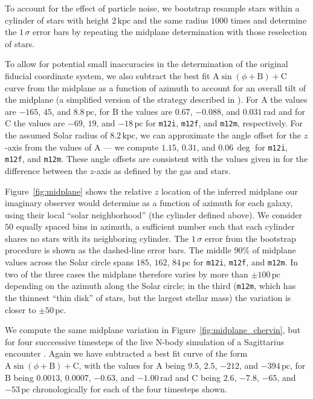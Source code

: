 \documentclass[twocolumn]{aastex62}
\newcommand{\pc}{\text{pc}}
\newcommand{\kpc}{\text{kpc}}
\newcommand{\mi}{\texttt{m12i}}
\newcommand{\mf}{\texttt{m12f}}
\newcommand{\mm}{\texttt{m12m}}
\begin{document}
To account for the effect of particle noise, we bootstrap resample stars
within a cylinder of stars with height $2\,\kpc$ and the same radius $1000$
times and determine the $1\,\sigma$ error bars by repeating the midplane
determination with those reselection of stars.

To allow for potential small inaccuracies in the determination of the original
fiducial coordinate system, we also subtract the best fit $\text{A}
\sin{\left(\phi + \text{B}\right)} + \text{C}$ curve from the midplane as a
function of azimuth to account for an overall tilt of the midplane (a
simplified version of the strategy described in
\citealt{2019ApJ...871..145A}). For $\text{A}$ the values are $-165$, $45$,
and $8.8\,\pc$, for $\text{B}$ the values are $0.67$, $-0.088$, and
$0.031\,\text{rad}$ and for $\text{C}$ the values are $-69$, $19$, and
$-18\,\pc$ for \mi{}, \mf{}, and \mm{}, respectively. For the assumed Solar
radius of $8.2\,\kpc$, we can approximate the angle offset for the $z$-axis
from the values of $\text{A}$ --- we compute $1.15$, $0.31$, and $0.06\,\deg$
for \mi{}, \mf{}, and \mm{}. These angle offsets are consistent with the
values given in \citet{2018arXiv180610564S} for the difference between the
$z$-axis as defined by the gas and stars.

Figure~\ref{fig:midplane} shows the relative $z$ location of the inferred
midplane our imaginary observer would determine as a function of azimuth for
each galaxy, using their local ``solar neighborhood'' (the cylinder defined
above). We consider $50$ equally spaced bins in azimuth, a sufficient number
such that each cylinder shares no stars with its neighboring cylinder. The
$1\,\sigma$ error from the bootstrap procedure is shown as the dashed-line
error bars. The middle $90\%$ of midplane values across the Solar circle spans
$185$, $162$, $84\,\pc$ for \mi{}, \mf{}, and \mm{}. In two of the three cases
the midplane therefore varies by more than $\pm 100\,\pc$ depending on the
azimuth along the Solar circle; in the third (\mm{}, which has the thinnest
``thin disk'' of stars, but the largest stellar mass) the variation is closer
to $\pm 50\,\pc$.

We compute the same midplane variation in Figure~\ref{fig:midplane_chervin},
but for four succcessive timesteps of the live N-body simulation of a
Sagittarius encounter \citep{2018MNRAS.481..286L}. Again we have subtracted a
best fit curve of the form $\text{A} \sin{\left(\phi + \text{B}\right)} +
\text{C}$, with the values for $\text{A}$ being $9.5$, $2.5$, $-212$, and
$-394\,\pc$, for $\text{B}$ being $0.0013$, $0.0007$, $-0.63$, and
$-1.00\,\text{rad}$ and $\text{C}$ being $2.6$, $-7.8$, $-65$, and $-53\,\pc$
chronologically for each of the four timesteps shown.
\end{document}
